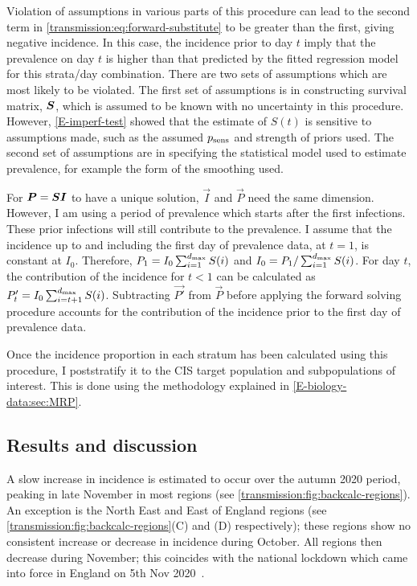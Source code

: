 \documentclass[thesis.tex]{subfiles}
\begin{document}
Violation of assumptions in various parts of this procedure can lead to the second term in \cref{transmission:eq:forward-substitute} to be greater than the first, giving negative incidence.
In this case, the incidence prior to day $t$ imply that the prevalence on day $t$ is higher than that predicted by the fitted regression model for this strata/day combination.
There are two sets of assumptions which are most likely to be violated.
The first set of assumptions is in constructing survival matrix, $\bm{S}$, which is assumed to be known with no uncertainty in this procedure.
However, \cref{E-imperf-test} showed that the estimate of $S(t)$ is sensitive to assumptions made, such as the assumed $p_\text{sens}$ and strength of priors used.
The second set of assumptions are in specifying the statistical model used to estimate prevalence, for example the form of the smoothing used.

For $\bm{P} = \bm{S} \bm{I}$ to have a unique solution, $\vec{I}$ and $\vec{P}$ need the same dimension.
However, I am using a period of prevalence which starts after the first infections.
These prior infections will still contribute to the prevalence.
I assume that the incidence up to and including the first day of prevalence data, at $t = 1$, is constant at $I_0$.
Therefore, $P_1 = I_0 \sum_{i=1}^{d_\text{max}} S(i)$ and $I_0 = P_1 / \sum_{i=1}^{d_\text{max}} S(i)$.
For day $t$, the contribution of the incidence for $t < 1$ can be calculated as $P'_t = I_0 \sum_{i=t+1}^{d_\text{max}} S(i)$.
Subtracting $\vec{P'}$ from $\vec{P}$ before applying the forward solving procedure accounts for the contribution of the incidence prior to the first day of prevalence data.

Once the incidence proportion in each stratum has been calculated using this procedure, I poststratify it to the CIS target population and subpopulations of interest.
This is done using the methodology explained in \cref{E-biology-data:sec:MRP}.


\subsection{Results and discussion} \label{backcalc:sec:results}

A slow increase in incidence is estimated to occur over the autumn 2020 period, peaking in late November in most regions (see \cref{transmission:fig:backcalc-regions}).
An exception is the North East and East of England regions (see \cref{transmission:fig:backcalc-regions}(C) and (D) respectively); these regions show no consistent increase or decrease in incidence during October.
All regions then decrease during November; this coincides with the national lockdown which came into force in England on 5th Nov 2020~\autocite{ifgTimeline}.
\end{document}
